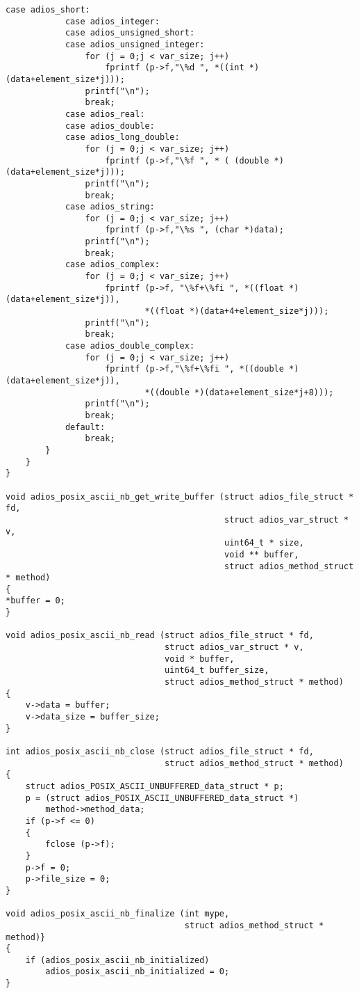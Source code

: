 \begin{lstlisting}[emph={ADIOS_METHOD_POSIX_ASCII_NB}, emphstyle={\color{red}\large\bf},
                   caption={Example: add unbuffered POSIX method, C source of write method}]
            case adios_short:
            case adios_integer:
            case adios_unsigned_short:
            case adios_unsigned_integer:
                for (j = 0;j < var_size; j++)
                    fprintf (p->f,"\%d ", *((int *)(data+element_size*j)));
                printf("\n");
                break;
            case adios_real:
            case adios_double:
            case adios_long_double:
                for (j = 0;j < var_size; j++)
                    fprintf (p->f,"\%f ", * ( (double *)(data+element_size*j)));
                printf("\n");
                break;
            case adios_string:
                for (j = 0;j < var_size; j++)
                    fprintf (p->f,"\%s ", (char *)data);
                printf("\n");
                break;
            case adios_complex:
                for (j = 0;j < var_size; j++)
                    fprintf (p->f, "\%f+\%fi ", *((float *)(data+element_size*j)),
                            *((float *)(data+4+element_size*j)));
                printf("\n");
                break;
            case adios_double_complex:
                for (j = 0;j < var_size; j++)
                    fprintf (p->f,"\%f+\%fi ", *((double *)(data+element_size*j)),
                            *((double *)(data+element_size*j+8)));
                printf("\n");
                break;
            default:
                break;
        } 
    }
}

void adios_posix_ascii_nb_get_write_buffer (struct adios_file_struct * fd,
                                            struct adios_var_struct * v,
                                            uint64_t * size,
                                            void ** buffer,
                                            struct adios_method_struct * method)
{
*buffer = 0;
}

void adios_posix_ascii_nb_read (struct adios_file_struct * fd,
                                struct adios_var_struct * v, 
                                void * buffer,
                                uint64_t buffer_size,
                                struct adios_method_struct * method)
{
    v->data = buffer;
    v->data_size = buffer_size; 
}

int adios_posix_ascii_nb_close (struct adios_file_struct * fd,
                                struct adios_method_struct * method)
{
    struct adios_POSIX_ASCII_UNBUFFERED_data_struct * p;
    p = (struct adios_POSIX_ASCII_UNBUFFERED_data_struct *)
        method->method_data;
    if (p->f <= 0)
    {
        fclose (p->f);
    }
    p->f = 0;
    p->file_size = 0; 
}

void adios_posix_ascii_nb_finalize (int mype, 
                                    struct adios_method_struct * method)} 
{
    if (adios_posix_ascii_nb_initialized)
        adios_posix_ascii_nb_initialized = 0; 
}

\end{lstlisting}

